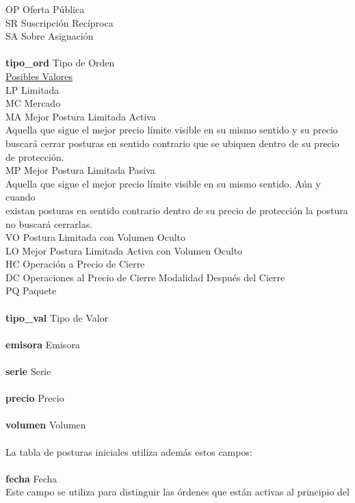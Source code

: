 \documentclass[11pt]{article}
\numberwithin{equation}{section} %
\begin{document}
\begin{tabbing}
OP \> Oferta Pública\\
SR \> Suscripción Recíproca\\
SA \> Sobre Asignación\\
\\
\textbf{tipo\_ord} \> Tipo de Orden\\
\underline{Posibles Valores} \\
LP \> Limitada\\
MC \> Mercado\\
MA \> Mejor Postura Limitada Activa\\
Aquella que sigue el mejor precio límite visible en su mismo sentido y su precio \\
buscará cerrar posturas en sentido contrario que se ubiquen dentro de su precio\\
de protección.\\
MP \> Mejor Postura Limitada Pasiva\\
Aquella que sigue el mejor precio límite visible en su mismo sentido. Aún y cuando\\
existan posturas en sentido contrario dentro de su precio de protección la postura\\
no buscará cerrarlas.\\
VO \> Postura Limitada con Volumen Oculto\\
LO \> Mejor Postura Limitada Activa con Volumen Oculto\\
HC \> Operación a Precio de Cierre\\
DC \> Operaciones al Precio de Cierre Modalidad Después del Cierre\\
PQ \> Paquete \\
\\
\textbf{tipo\_val} \> Tipo de Valor\\
\\
\textbf{emisora} \> Emisora\\
\\
\textbf{serie} \> Serie\\
\\
\textbf{precio} \> Precio\\
\\
\textbf{volumen} \> Volumen\\
\\
La tabla de posturas iniciales utiliza además estos campos:\\
\\
\textbf{fecha} \> Fecha\\
Este campo se utiliza para distinguir las órdenes que están activas al principio del\\

\end{tabbing}
\end{document}
